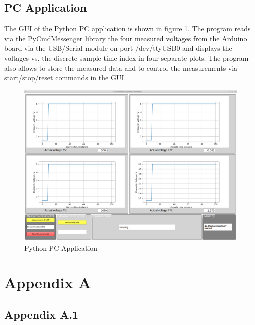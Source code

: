 \documentclass[11pt, oneside]{scrartcl}   	%
\begin{document}
\subsection{PC Application}
The GUI of the Python PC application is shown in figure \ref{fig:ApplicationWindow}. The program reads via the PyCmdMessenger library the four measured voltages from the Arduino board
via the USB/Serial module on port /dev/ttyUSB0 and displays the voltages vs. the discrete sample time index in four separate plots.
The program also allows to store the measured data and to control the measurements via start/stop/reset commands in the GUI.
\begin{figure}[htbp]
	\centering
	\includegraphics[width=1.0\linewidth]{Figures/ApplicationWindow.png}
	\caption[Python PC Application]{Python PC Application}
	\label{fig:ApplicationWindow}
\end{figure}
\newpage

\appendix
\section{Appendix A}
\subsection{Appendix A.1}	
\end{document}
